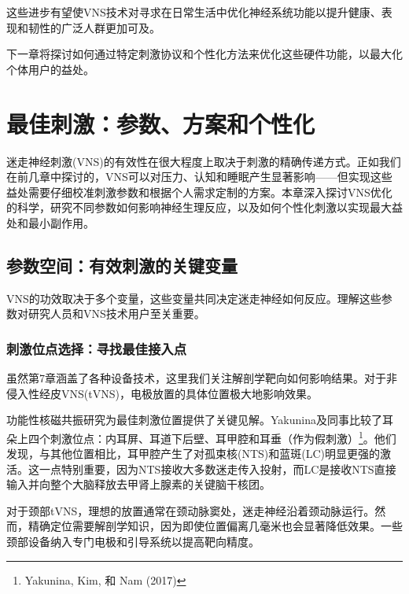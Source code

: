 \documentclass[
  Letterpaper,
]{scrbook}
\begin{document}
这些进步有望使VNS技术对寻求在日常生活中优化神经系统功能以提升健康、表现和韧性的广泛人群更加可及。

下一章将探讨如何通过特定刺激协议和个性化方法来优化这些硬件功能，以最大化个体用户的益处。


\chapter{最佳刺激：参数、方案和个性化}\label{ux6700ux4f73ux523aux6fc0ux53c2ux6570ux65b9ux6848ux548cux4e2aux6027ux5316}

迷走神经刺激(VNS)的有效性在很大程度上取决于刺激的精确传递方式。正如我们在前几章中探讨的，VNS可以对压力、认知和睡眠产生显著影响------但实现这些益处需要仔细校准刺激参数和根据个人需求定制的方案。本章深入探讨VNS优化的科学，研究不同参数如何影响神经生理反应，以及如何个性化刺激以实现最大益处和最小副作用。

\section{参数空间：有效刺激的关键变量}\label{ux53c2ux6570ux7a7aux95f4ux6709ux6548ux523aux6fc0ux7684ux5173ux952eux53d8ux91cf}

VNS的功效取决于多个变量，这些变量共同决定迷走神经如何反应。理解这些参数对研究人员和VNS技术用户至关重要。

\subsection{刺激位点选择：寻找最佳接入点}\label{ux523aux6fc0ux4f4dux70b9ux9009ux62e9ux5bfbux627eux6700ux4f73ux63a5ux5165ux70b9}

虽然第7章涵盖了各种设备技术，这里我们关注解剖学靶向如何影响结果。对于非侵入性经皮VNS(tVNS)，电极放置的具体位置极大地影响效果。

功能性核磁共振研究为最佳刺激位置提供了关键见解。Yakunina及同事比较了耳朵上四个刺激位点：内耳屏、耳道下后壁、耳甲腔和耳垂（作为假刺激）\footnote{Yakunina,
  Kim, 和 Nam (2017)}。他们发现，与其他位置相比，耳甲腔产生了对孤束核(NTS)和蓝斑(LC)明显更强的激活。这一点特别重要，因为NTS接收大多数迷走传入投射，而LC是接收NTS直接输入并向整个大脑释放去甲肾上腺素的关键脑干核团。

对于颈部tVNS，理想的放置通常在颈动脉窦处，迷走神经沿着颈动脉运行。然而，精确定位需要解剖学知识，因为即使位置偏离几毫米也会显著降低效果。一些颈部设备纳入专门电极和引导系统以提高靶向精度。
\end{document}
